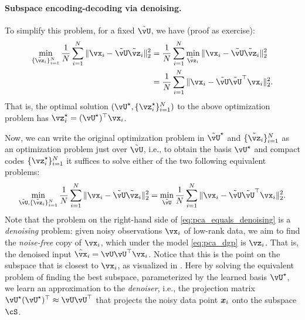 \documentclass[../../book-main.tex]{subfiles}
\begin{document}
\paragraph{Subspace encoding-decoding via denoising.}
To simplify this problem, for a fixed \(\tilde{\vU}\), we have (proof as exercise):
\begin{align}
    \min_{\{\tilde{\vz}_{i}\}_{i = 1}^{N}}\frac{1}{N}\sum_{i = 1}^{N}\norm{\vx_{i} - \tilde{\vU}\tilde{\vz}_{i}}_{2}^{2} 
    &= \frac{1}{N}\sum_{i = 1}^{N}\min_{\tilde{\vz}_{i}}\norm{\vx_{i} - \tilde{\vU}\tilde{\vz}_{i}}_{2}^{2} \\
    &= \frac{1}{N}\sum_{i = 1}^{N}\norm{\vx_{i} - \tilde{\vU}\tilde{\vU}^{\top}\vx_{i}}_{2}^{2}. 
\end{align}
That is, the optimal solution \((\vU^{\star}, \{\vz_{i}^{\star}\}_{i = 1}^{N})\)
to the above optimization problem has $\vz_i^{\star} = (\vU^{\star})^\top\vx_i$.

Now, we can write the original optimization problem in \(\tilde{\vU}^{\star}\)
and \(\{\tilde{\vz}_{i}\}_{i = 1}^{N}\) as an optimization problem just over
\(\tilde{\vU}\), i.e., to obtain the basis \(\vU^{\star}\) and compact codes
\(\{\vz_{i}^{\star}\}_{i = 1}^{N}\) it suffices to solve either of the two following equivalent problems:
\begin{equation}\label{eq:pca_equals_denoising}
    \min_{\tilde{\vU}, \{\tilde{\vz}_{i}\}_{i = 1}^{N}}\frac{1}{N}\sum_{i = 1}^{N}\norm{\vx_{i} - \tilde{\vU}\tilde{\vz}_{i}}_{2}^{2} = \min_{\tilde{\vU}}\frac{1}{N}\sum_{i = 1}^{N}\norm{\vx_{i} - \tilde{\vU}\tilde{\vU}^{\top}\vx_{i}}_{2}^{2}.
\end{equation}
Note that the problem on the right-hand side of \eqref{eq:pca_equals_denoising}
is a \textit{denoising} problem: given noisy observations \(\vx_{i}\) of
low-rank data, we aim to find the \textit{noise-free} copy of \(\vx_{i}\), which
under the model \eqref{eq:pca_dgp} is $\vz_{i}$. That is, the denoised input
$\hat{\vx}_i = \vU\vU^\top \vx_i$. Notice that this is the point on the subspace
that is closest to $\vx_i$, as visualized in . Here by
solving the equivalent problem of finding the best subspace, parameterized by
the learned basis \(\vU^{\star}\), we learn an approximation to the
\textit{denoiser}, i.e., the projection matrix \(\vU^{\star}(\vU^{\star})^{\top} \approx \vU\vU^{\top}\) that projects the noisy data point $\bm{x}_i$ onto the subspace \(\cS\). %
\end{document}
